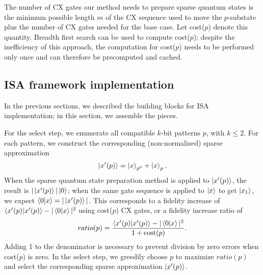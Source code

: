 \documentclass{article}
\begin{document}
The number of CX gates our method needs to prepare sparse quantum states is
the minimum possible length $m$ of the CX sequence used to move the 
$p$-substate plus the number of CX gates needed for the base case. Let cost($p$)
denote this quantity. Breadth first search can be used to compute cost($p$);
despite the inefficiency of this approach, the computation for cost($p$) needs 
to be performed only once and can therefore be precomputed and cached.

\subsection{ISA framework implementation}
In the previous sections, we described the building blocks for ISA
implementation; in this section, we assemble the pieces.

For the select step, we enumerate all compatible $k$-bit patterns $p$, with 
$k \leq 2$. For each pattern, we construct the corresponding (non-normalized) 
sparse approximation
$$\mathinner{|{x'(p)}\rangle} = \mathinner{|{x}\rangle}_{p^0} + \mathinner{|{x}\rangle}_{p}.$$
When the sparse quantum state preparation method is applied to $\mathinner{|{x'(p)}\rangle}$,
the result is $|\mathinner{|{x'(p)}\rangle}| \mathinner{|{0}\rangle}$; when the same gate sequence is applied
to $\mathinner{|{x}\rangle}$ to get $\mathinner{|{x_1}\rangle}$, we expect $\mathinner{\langle{0|x}\rangle} = |\mathinner{|{x'(p)}\rangle}|$.
This corresponds to a fidelity increase of 
$\mathinner{\langle{x'(p)|x'(p)}\rangle} - |\mathinner{\langle{0|x}\rangle}|^2$ using cost($p$)
CX gates, or a fidelity increase ratio of
$$ratio(p) = \frac{\mathinner{\langle{x'(p)|x'(p)}\rangle} - |\mathinner{\langle{0|x}\rangle}|^2}{1 + \text{cost}(p)}.$$
Adding 1 to the denominator is necessary to prevent division by zero errors when
cost($p$) is zero. In the select step, we greedily choose $p$ to maximize
$ratio(p)$ and select the corresponding sparse approximation $\mathinner{|{x'(p)}\rangle}$.
\end{document}
